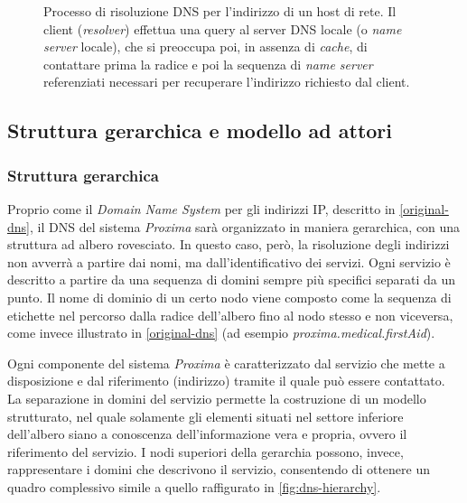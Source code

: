 \documentclass[a4paper,12pt]{report}
\begin{document}
\begin{description}
\begin{figure}[H]
		\caption{Processo di risoluzione DNS per l'indirizzo di un host di rete. Il client (\emph{resolver}) effettua una query al server DNS locale (o \emph{name server} locale), che si preoccupa poi, in assenza di \emph{cache}, di contattare prima la radice e poi la sequenza di \emph{name server} referenziati necessari per recuperare l'indirizzo richiesto dal client.}
		\label{fig:dns-resolution}
	\end{figure}
\end{description}

\subsection{Struttura gerarchica e modello ad attori} 
\subsubsection{Struttura gerarchica}\label{dns-hierarchy}
Proprio come il \emph{Domain Name System} per gli indirizzi IP, descritto in \autoref{original-dns}, il DNS del sistema \emph{Proxima} sarà organizzato in maniera gerarchica, con una struttura ad albero rovesciato. In questo caso, però, la risoluzione degli indirizzi non avverrà a partire dai nomi, ma dall'identificativo dei servizi. Ogni servizio è descritto a partire da una sequenza di domini sempre più specifici separati da un punto. Il nome di dominio di un certo nodo viene composto come la sequenza di etichette nel percorso dalla radice dell'albero fino al nodo stesso e non viceversa, come invece illustrato in \autoref{original-dns} (ad esempio \emph{proxima.medical.firstAid}). 

Ogni componente del sistema \emph{Proxima} è caratterizzato dal servizio che mette a disposizione e dal riferimento (indirizzo) tramite il quale può essere contattato. La separazione in domini del servizio permette la costruzione di un modello strutturato, nel quale solamente gli elementi situati nel settore inferiore dell'albero siano a conoscenza dell'informazione vera e propria, ovvero il riferimento del servizio. I nodi superiori della gerarchia possono, invece, rappresentare i domini che descrivono il servizio, consentendo di ottenere un quadro complessivo simile a quello raffigurato in \autoref{fig:dns-hierarchy}.
\end{document}
